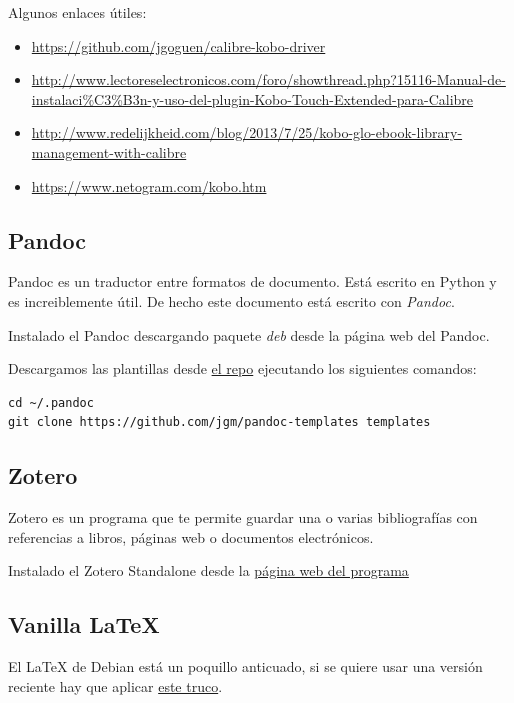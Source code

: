 \documentclass[12pt,spanish,]{scrartcl}
\providecommand{\tightlist}{%
  \setlength{\itemsep}{0pt}\setlength{\parskip}{0pt}}
\begin{document}
Algunos enlaces útiles:

\begin{itemize}
\tightlist
\item
  \url{https://github.com/jgoguen/calibre-kobo-driver}
\item
  \url{http://www.lectoreselectronicos.com/foro/showthread.php?15116-Manual-de-instalaci\%C3\%B3n-y-uso-del-plugin-Kobo-Touch-Extended-para-Calibre}
\item
  \url{http://www.redelijkheid.com/blog/2013/7/25/kobo-glo-ebook-library-management-with-calibre}
\item
  \url{https://www.netogram.com/kobo.htm}
\end{itemize}

\hypertarget{pandoc}{%
\subsection{Pandoc}\label{pandoc}}

Pandoc es un traductor entre formatos de documento. Está escrito en
Python y es increiblemente útil. De hecho este documento está escrito
con \emph{Pandoc}.

Instalado el Pandoc descargando paquete \emph{deb} desde la página web
del Pandoc.

Descargamos las plantillas desde
\href{https://github.com/jgm/pandoc-templates}{el repo} ejecutando los
siguientes comandos:

\begin{verbatim}
cd ~/.pandoc
git clone https://github.com/jgm/pandoc-templates templates
\end{verbatim}

\hypertarget{zotero}{%
\subsection{Zotero}\label{zotero}}

Zotero es un programa que te permite guardar una o varias bibliografías
con referencias a libros, páginas web o documentos electrónicos.

Instalado el Zotero Standalone desde la
\href{https://www.zotero.org/}{página web del programa}

\hypertarget{vanilla-latex}{%
\subsection{Vanilla LaTeX}\label{vanilla-latex}}

El LaTeX de Debian está un poquillo anticuado, si se quiere usar una
versión reciente hay que aplicar
\href{http://tex.stackexchange.com/questions/1092/how-to-install-vanilla-texlive-on-debian-or-ubuntu}{este
truco}.
\end{document}
